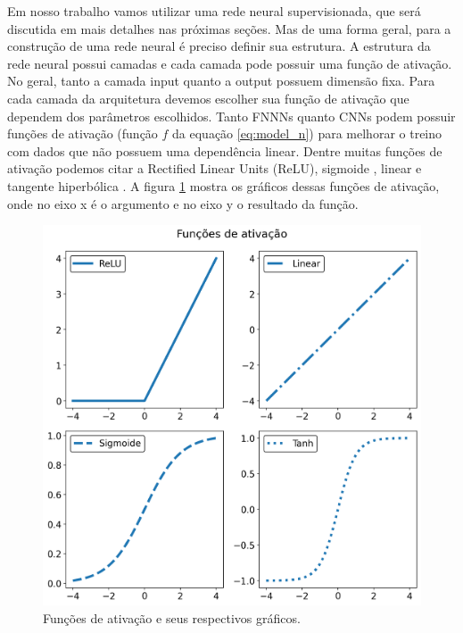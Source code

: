 \documentclass[a4paper,12pt,oneside]{book}
\begin{document}
\par Em nosso trabalho vamos utilizar uma rede neural supervisionada, que será discutida em mais detalhes nas próximas seções. Mas de uma forma geral, para a construção de uma rede neural é preciso definir sua estrutura. A estrutura da rede neural possui camadas e cada camada pode possuir uma função de ativação. No geral, tanto a camada input quanto a output possuem dimensão fixa. Para cada camada da arquitetura devemos escolher sua função de ativação que dependem dos parâmetros escolhidos. Tanto FNNNs quanto CNNs podem possuir funções de ativação (função $f$ da equação \ref{eq:model_n}) para melhorar o treino com dados que não possuem uma dependência linear. Dentre muitas funções de ativação podemos citar a Rectified Linear Units (ReLU)\cite{RELU}, sigmoide \cite{sigmoid_act}, linear e tangente hiperbólica \cite{act_comp}. A figura \ref{fig:ativacoes} mostra os gráficos dessas funções de ativação, onde no eixo x é o argumento e no eixo y o resultado da função.
\begin{figure}[H]
    \centering
    \includegraphics[scale = 0.7]{figs/ativacoes.png}
    \caption{Funções de ativação e seus respectivos gráficos.}
    \label{fig:ativacoes}
\end{figure}
\end{document}

